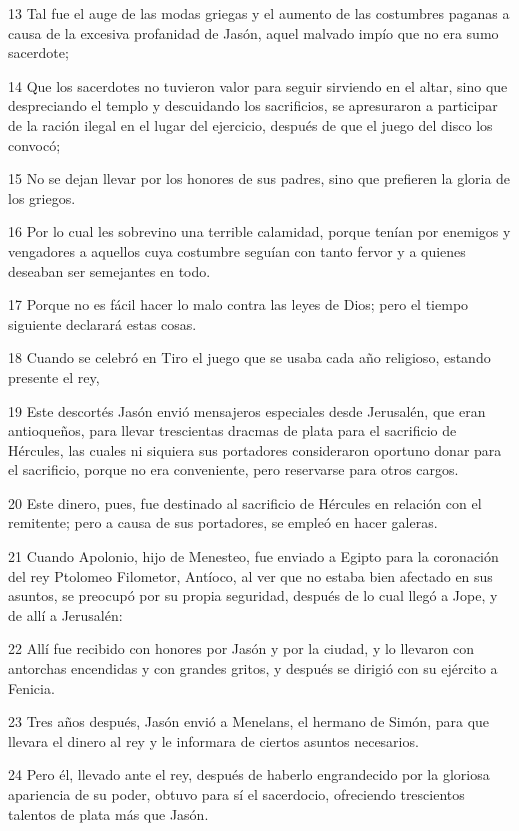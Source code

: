 \par 13 Tal fue el auge de las modas griegas y el aumento de las costumbres paganas a causa de la excesiva profanidad de Jasón, aquel malvado impío que no era sumo sacerdote;
\par 14 Que los sacerdotes no tuvieron valor para seguir sirviendo en el altar, sino que despreciando el templo y descuidando los sacrificios, se apresuraron a participar de la ración ilegal en el lugar del ejercicio, después de que el juego del disco los convocó;
\par 15 No se dejan llevar por los honores de sus padres, sino que prefieren la gloria de los griegos.
\par 16 Por lo cual les sobrevino una terrible calamidad, porque tenían por enemigos y vengadores a aquellos cuya costumbre seguían con tanto fervor y a quienes deseaban ser semejantes en todo.
\par 17 Porque no es fácil hacer lo malo contra las leyes de Dios; pero el tiempo siguiente declarará estas cosas.
\par 18 Cuando se celebró en Tiro el juego que se usaba cada año religioso, estando presente el rey,
\par 19 Este descortés Jasón envió mensajeros especiales desde Jerusalén, que eran antioqueños, para llevar trescientas dracmas de plata para el sacrificio de Hércules, las cuales ni siquiera sus portadores consideraron oportuno donar para el sacrificio, porque no era conveniente, pero reservarse para otros cargos.
\par 20 Este dinero, pues, fue destinado al sacrificio de Hércules en relación con el remitente; pero a causa de sus portadores, se empleó en hacer galeras.
\par 21 Cuando Apolonio, hijo de Menesteo, fue enviado a Egipto para la coronación del rey Ptolomeo Filometor, Antíoco, al ver que no estaba bien afectado en sus asuntos, se preocupó por su propia seguridad, después de lo cual llegó a Jope, y de allí a Jerusalén:
\par 22 Allí fue recibido con honores por Jasón y por la ciudad, y lo llevaron con antorchas encendidas y con grandes gritos, y después se dirigió con su ejército a Fenicia.
\par 23 Tres años después, Jasón envió a Menelans, el hermano de Simón, para que llevara el dinero al rey y le informara de ciertos asuntos necesarios.
\par 24 Pero él, llevado ante el rey, después de haberlo engrandecido por la gloriosa apariencia de su poder, obtuvo para sí el sacerdocio, ofreciendo trescientos talentos de plata más que Jasón.

